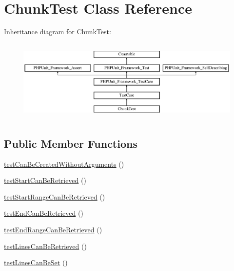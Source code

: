 \hypertarget{class_sebastian_bergmann_1_1_diff_1_1_chunk_test}{}\section{Chunk\+Test Class Reference}
\label{class_sebastian_bergmann_1_1_diff_1_1_chunk_test}
Inheritance diagram for Chunk\+Test\+:\begin{figure}[H]
\begin{center}
\leavevmode
\includegraphics[height=4.129793cm]{class_sebastian_bergmann_1_1_diff_1_1_chunk_test}
\end{center}
\end{figure}
\subsection*{Public Member Functions}
\begin{DoxyCompactItemize}
\item 
\mbox{\hyperlink{class_sebastian_bergmann_1_1_diff_1_1_chunk_test_a5576421ac12ca6e91ead5189893523bf}{test\+Can\+Be\+Created\+Without\+Arguments}} ()
\item 
\mbox{\hyperlink{class_sebastian_bergmann_1_1_diff_1_1_chunk_test_a8fc87d5184dbccf16bb6f996a55387a8}{test\+Start\+Can\+Be\+Retrieved}} ()
\item 
\mbox{\hyperlink{class_sebastian_bergmann_1_1_diff_1_1_chunk_test_aa0598eae10fc0dc5e7c193d5807911fe}{test\+Start\+Range\+Can\+Be\+Retrieved}} ()
\item 
\mbox{\hyperlink{class_sebastian_bergmann_1_1_diff_1_1_chunk_test_af17549a47b58353837ce54985d81ed04}{test\+End\+Can\+Be\+Retrieved}} ()
\item 
\mbox{\hyperlink{class_sebastian_bergmann_1_1_diff_1_1_chunk_test_ab88495b4ac817760aff4a7e92b90c3d2}{test\+End\+Range\+Can\+Be\+Retrieved}} ()
\item 
\mbox{\hyperlink{class_sebastian_bergmann_1_1_diff_1_1_chunk_test_a67bfedf1f175e7d892df6ebf720bfc1d}{test\+Lines\+Can\+Be\+Retrieved}} ()
\item 
\mbox{\hyperlink{class_sebastian_bergmann_1_1_diff_1_1_chunk_test_af366f36eb08b8d2c49025e627512e9de}{test\+Lines\+Can\+Be\+Set}} ()
\end{DoxyCompactItemize}
